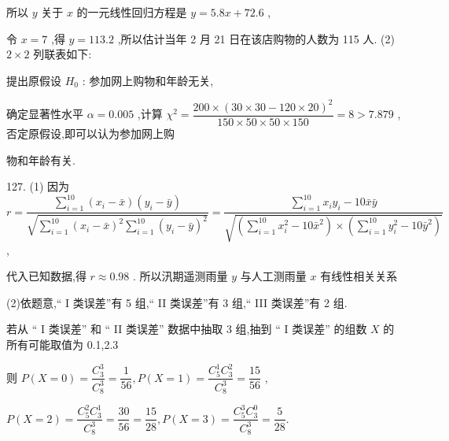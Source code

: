 所以 $y$ 关于 $x$ 的一元线性回归方程是 $y = {5.8x} + {72.6}$ ,

令 $x = 7$ ,得 $\widehat{y} = {113.2}$ ,所以估计当年 2 月 21 日在该店购物的人数为 115 人. (2) $2 \times  2$ 列联表如下:

\begin{center}
\end{center}

提出原假设 ${H}_{0}$ : 参加网上购物和年龄无关,

确定显著性水平 $\alpha  = {0.005}$ ,计算 ${\chi }^{2} = \dfrac{{200} \times  {\left( {30} \times  {30} - {120} \times  {20}\right) }^{2}}{{150} \times  {50} \times  {50} \times  {150}} = 8 > {7.879}$ ,否定原假设,即可以认为参加网上购

物和年龄有关.

127. (1) 因为 $r = \dfrac{\mathop{\sum }\limits_{{i = 1}}^{{10}}\left( {{x}_{i} - \bar{x}}\right) \left( {{y}_{i} - \bar{y}}\right) }{\sqrt{\mathop{\sum }\limits_{{i = 1}}^{{10}}{\left( {x}_{i} - \bar{x}\right) }^{2}\mathop{\sum }\limits_{{i = 1}}^{{10}}{\left( {y}_{i} - \bar{y}\right) }^{2}}} = \dfrac{\mathop{\sum }\limits_{{i = 1}}^{{10}}{x}_{i}{y}_{i} - {10}\bar{x}\bar{y}}{\sqrt{\left( {\mathop{\sum }\limits_{{i = 1}}^{{10}}{x}_{i}^{2} - {10}{\bar{x}}^{2}}\right)  \times  \left( {\mathop{\sum }\limits_{{i = 1}}^{{10}}{y}_{i}^{2} - {10}{\bar{y}}^{2}}\right) }}$ ,

代入已知数据,得 $r \approx  {0.98}$ . 所以汛期遥测雨量 $y$ 与人工测雨量 $x$ 有线性相关关系

(2)依题意,“ I 类误差”有 5 组,“ II 类误差”有 3 组,“ III 类误差”有 2 组.

若从 “ I 类误差” 和 “ II 类误差” 数据中抽取 3 组,抽到 “ I 类误差” 的组数 $X$ 的所有可能取值为 0.1,2.3

则 $P\left( {X = 0}\right)  = \dfrac{{C}_{3}^{3}}{{C}_{8}^{3}} = \dfrac{1}{56},P\left( {X = 1}\right)  = \dfrac{{C}_{5}^{1}{C}_{3}^{2}}{{C}_{8}^{3}} = \dfrac{15}{56}$ ,

$P\left( {X = 2}\right)  = \dfrac{{C}_{5}^{2}{C}_{3}^{1}}{{C}_{8}^{3}} = \dfrac{30}{56} = \dfrac{15}{28},P\left( {X = 3}\right)  = \dfrac{{C}_{5}^{3}{C}_{3}^{0}}{{C}_{8}^{3}} = \dfrac{5}{28}.$

